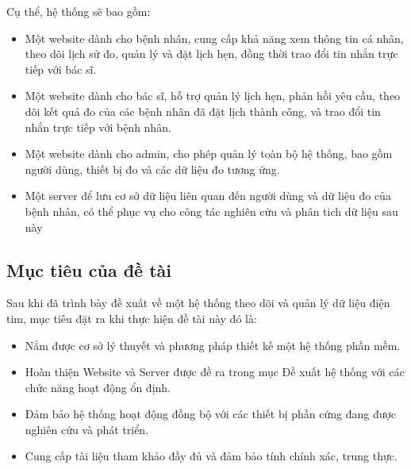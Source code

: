 Cụ thể, hệ thống sẽ bao gồm:

\begin{adjustwidth}{1.5em}{}
  \begin{itemize}
     
      \item Một website dành cho bệnh nhân, cung cấp khả năng xem thông tin cá nhân, theo dõi lịch sử đo, quản lý và đặt lịch hẹn, đồng thời trao đổi tin nhắn trực tiếp với bác sĩ.
      \item Một website dành cho bác sĩ, hỗ trợ quản lý lịch hẹn, phản hồi yêu cầu, theo dõi kết quả đo của các bệnh nhân đã đặt lịch thành công, và trao đổi tin nhắn trực tiếp với bệnh nhân.
      \item Một website dành cho admin, cho phép quản lý toàn bộ hệ thống, bao gồm người dùng, thiết bị đo và các dữ liệu đo tương ứng.
      \item Một server để lưu cơ sở dữ liệu liên quan đến người dùng và dữ liệu đo của bệnh nhân, có thể phục vụ cho công tác nghiên cứu và phân tich dữ liệu sau này

  \end{itemize}
  \end{adjustwidth}


\subsection*{Mục tiêu của đề tài}
Sau khi đã trình bày đề xuất về một hệ thống theo dõi và quản lý dữ liệu điện tim, mục tiêu đặt ra khi thực hiện
đề tài này đó là:

\begin{adjustwidth}{1.5em}{}
  \begin{itemize}
      \item Nắm được cơ sở lý thuyết và phương pháp thiết kế một hệ thống phần mềm.
      \item Hoàn thiện Website và Server được đề ra trong mục Đề xuất hệ thống với các chức năng hoạt động ổn định.
      \item Đảm bảo hệ thống hoạt động đồng bộ với các thiết bị phần cứng đang được nghiên cứu và phát triển.
      \item Cung cấp tài liệu tham khảo đầy đủ và đảm bảo tính chính xác, trung thực.

  \end{itemize}
  \end{adjustwidth}





